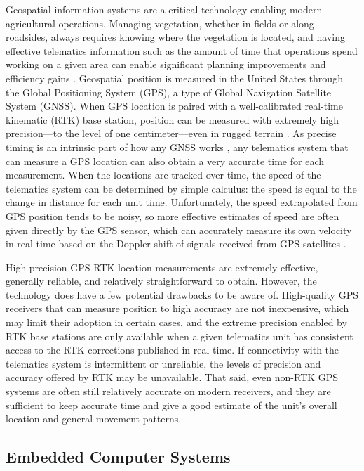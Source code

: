 \documentclass[
]{article}
\begin{document}
Geospatial information systems are a critical technology enabling modern
agricultural operations. Managing vegetation, whether in fields or along
roadsides, always requires knowing where the vegetation is located, and
having effective telematics information such as the amount of time that
operations spend working on a given area can enable significant planning
improvements and efficiency gains
\parencite{Skliar_IncreasingPerformancePark_2021}. Geospatial position is
measured in the United States through the Global Positioning System
(GPS), a type of Global Navigation Satellite System (GNSS). When GPS
location is paired with a well-calibrated real-time kinematic (RTK) base
station, position can be measured with extremely high precision---to the
level of one centimeter---even in rugged terrain
\parencite{Marucci_PrecisionFarmingHilly_2017}. As precise timing is an
intrinsic part of how any GNSS works
\parencite{HofmannWellenhof_GnssGlobalIntroduction_2008}, any telematics
system that can measure a GPS location can also obtain a very accurate
time for each measurement. When the locations are tracked over time, the
speed of the telematics system can be determined by simple calculus: the
speed is equal to the change in distance for each unit time.
Unfortunately, the speed extrapolated from GPS position tends to be
noisy, so more effective estimates of speed are often given directly by
the GPS sensor, which can accurately measure its own velocity in
real-time based on the Doppler shift of signals received from GPS
satellites \parencite{HofmannWellenhof_GnssGlobalObservables_2008}.

High-precision GPS-RTK location measurements are extremely effective,
generally reliable, and relatively straightforward to obtain. However,
the technology does have a few potential drawbacks to be aware of.
High-quality GPS receivers that can measure position to high accuracy
are not inexpensive, which may limit their adoption in certain cases,
and the extreme precision enabled by RTK base stations are only
available when a given telematics unit has consistent access to the RTK
corrections published in real-time. If connectivity with the telematics
system is intermittent or unreliable, the levels of precision and
accuracy offered by RTK may be unavailable. That said, even non-RTK GPS
systems are often still relatively accurate on modern receivers, and
they are sufficient to keep accurate time and give a good estimate of
the unit's overall location and general movement patterns.

\subsection{Embedded Computer Systems}\label{sec:embedded}
\end{document}
